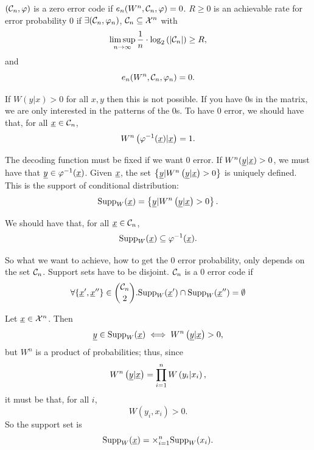 $(\mathcal{C}_n, \varphi)$ is a zero error code if $e_n(W^n, \mathcal{C}_n, \varphi) = 0$.
$R \geq 0$ is an achievable rate for error probability $0$ if $\exists (\mathcal{C}_n, \varphi_n)$, $\mathcal{C}_n \subseteq \mathcal{X}^n$ with
\begin{equation*}
	\limsup_{n \to \infty} \frac{1}{n} \cdot \log_2 \left( {\left|{\mathcal{C}_n}\right|} \right) \ge R,
\end{equation*}
and
\begin{equation*}
	e_n(W^n, \mathcal{C}_n, \varphi_n) = 0.
\end{equation*}

If $W(y|x) > 0$ for all $x, y$ then this is not possible.
If you have 0s in the matrix, we are only interested in the patterns of the 0s.
To have 0 error, we should have that, for all $\underline{x} \in \mathcal{C}_n$,
\begin{equation*}
	W^n \left( \varphi^{-1}(\underline{x}) | \underline{x} \right) = 1.
\end{equation*}

The decoding function must be fixed if we want $0$ error.
If $W^n(\underline{y} | \underline{x}) > 0$, we must have that $\underline{y} \in \varphi^{-1}(\underline{x})$.
Given $\underline{x}$, the set $\left\{ \underline{y} | W^n \left( \underline{y} | \underline{x} \right) > 0 \right\}$ is uniquely defined.
This is the support of conditional distribution:
\begin{equation*}
	\mathrm{Supp}_W(\underline{x}) = \left\{ \underline{y} |  W^n \left( \underline{y} | \underline{x} \right) > 0 \right\}.
\end{equation*}

We should have that, for all $\underline{x} \in \mathcal{C}_n$,
\begin{equation*}
	\mathrm{Supp}_W(\underline{x}) \subseteq \varphi^{-1}(\underline{x}).
\end{equation*}

So what we want to achieve, \ie how to get the 0 error probability, only depends on the set $\mathcal{C}_n$.
Support sets have to be disjoint.
$\mathcal{C}_n$ is a $0$ error code if
\begin{equation*}
	\forall \{ \underline{x}',\underline{x}'' \} \in \binom{\mathcal{C}_n}{2} .
	\mathrm{Supp}_W(\underline{x}') \cap \mathrm{Supp}_W(\underline{x}'') = \emptyset
\end{equation*}

\begin{obs}
	Let $\underline{x} \in \mathcal{X}^n$.
	Then
	\begin{equation*}
		\underline{y} \in \mathrm{Supp}_W(\underline{x}) \iff W^n \left( \underline{y} | \underline{x} \right) >0,
	\end{equation*}
	but $W^n$ is a product of probabilities; thus, since
	\begin{equation*}
		W^n \left( \underline{y} | \underline{x} \right) = \prod_{i=1}^{n} W \left( y_i | x_i \right),
	\end{equation*}
	it must be that, for all $i$,
	\begin{equation*}
		W(y_i, x_i) > 0.
	\end{equation*}
	So the support set is
	\begin{equation*}
		\mathrm{Supp}_W(\underline{x}) = \times_{i=1}^{n} \mathrm{Supp}_W(x_i).
	\end{equation*}
\end{obs}

